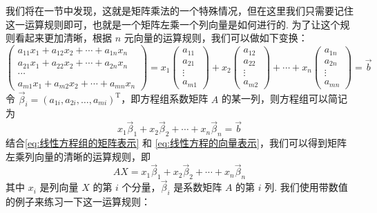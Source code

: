 我们将在一节中发现，这就是矩阵乘法的一个特殊情况，但在这里我们只需要记住这一运算规则即可，也就是一个矩阵左乘一个列向量是如何进行的. 为了让这个规则看起来更加清晰，根据 $n$ 元向量的运算规则，我们可以做如下变换：
\[\begin{pmatrix}
    a_{11} x_1 + a_{12} x_2 + \cdots + a_{1n} x_n \\
    a_{21} x_1 + a_{22} x_2 + \cdots + a_{2n} x_n \\
    \cdots\\
    a_{m1} x_1 + a_{m2} x_2 + \cdots + a_{mn} x_n
\end{pmatrix} = x_1 \begin{pmatrix}
    a_{11} \\ a_{21} \\ \vdots \\ a_{m1}
\end{pmatrix} + x_2 \begin{pmatrix}
    a_{12} \\ a_{22} \\ \vdots \\ a_{m2}
\end{pmatrix} + \cdots + x_n \begin{pmatrix}
    a_{1n} \\ a_{2n} \\ \vdots \\ a_{mn}
\end{pmatrix} = \vec{b}\]
令 $\vec{\beta}_i = (a_{1i},a_{2i},\ldots,a_{mi})^\mathrm{T}$，即方程组系数矩阵 $A$ 的某一列，则方程组可以简记为
\begin{equation} \label{eq:线性方程的向量表示}
    x_1\vec{\beta}_1 + x_2\vec{\beta}_2 + \cdots + x_n\vec{\beta}_n = \vec{b}
\end{equation}
结合\eqref{eq:线性方程组的矩阵表示} 和 \eqref{eq:线性方程的向量表示}，我们可以得到矩阵左乘列向量的清晰的运算规则，即
\begin{equation} \label{eq:矩阵左乘列向量}
    AX =  x_1\vec{\beta}_1 + x_2\vec{\beta}_2 + \cdots + x_n\vec{\beta}_n
\end{equation}
其中 $x_i$ 是列向量 $X$ 的第 $i$ 个分量，$\vec{\beta}_i$ 是系数矩阵 $A$ 的第 $i$ 列. 我们使用带数值的例子来练习一下这一运算规则：
